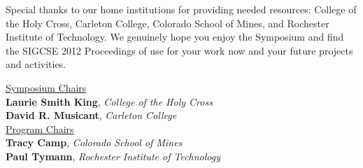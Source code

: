 Special thanks to our home institutions for providing needed resources: College of the Holy Cross, Carleton College, Colorado School of Mines, and Rochester Institute of Technology. We genuinely hope you enjoy the Symposium and find the SIGCSE 2012 Proceedings of use for your work now and your future projects and activities.

{\raggedleft
\underline{Symposium Chairs} \\
\vspace{0.5\baselineskip}
\textbf{Laurie Smith King}, \textit{College of the Holy Cross} \\
\textbf{David R. Musicant}, \textit{Carleton College} \\
\vspace{1em}
\underline{Program Chairs} \\
\vspace{0.5\baselineskip}
\textbf{Tracy Camp}, \textit{Colorado School of Mines} \\
\textbf{Paul Tymann}, \textit{Rochester Institute of Technology} 


}
\newpage
